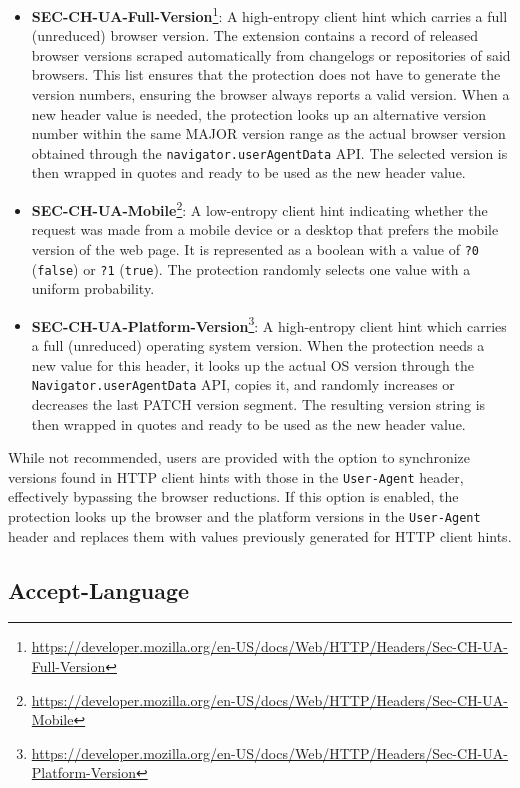 \begin{itemize}
	\item \textbf{SEC-CH-UA-Full-Version}\footnote{\url{https://developer.mozilla.org/en-US/docs/Web/HTTP/Headers/Sec-CH-UA-Full-Version}}: A high-entropy client hint which carries a full (unreduced) browser version. The extension contains a record of released browser versions scraped automatically from changelogs or repositories of said browsers. This list ensures that the protection does not have to generate the version numbers, ensuring the browser always reports a valid version. When a new header value is needed, the protection looks up an alternative version number within the same MAJOR version range as the actual browser version obtained through the \texttt{navigator.userAgentData} API. The selected version is then wrapped in quotes and ready to be used as the new header value.
	\item \textbf{SEC-CH-UA-Mobile}\footnote{\url{https://developer.mozilla.org/en-US/docs/Web/HTTP/Headers/Sec-CH-UA-Mobile}}: A low-entropy client hint indicating whether the request was made from a mobile device or a desktop that prefers the mobile version of the web page. It is represented as a boolean with a value of \texttt{?0} (\texttt{false}) or \texttt{?1} (\texttt{true}). The protection randomly selects one value with a uniform probability.
	\item \textbf{SEC-CH-UA-Platform-Version}\footnote{\url{https://developer.mozilla.org/en-US/docs/Web/HTTP/Headers/Sec-CH-UA-Platform-Version}}: A high-entropy client hint which carries a full (unreduced) operating system version. When the protection needs a new value for this header, it looks up the actual OS version through the \texttt{Navigator.userAgentData} API, copies it, and randomly increases or decreases the last PATCH version segment. The resulting version string is then wrapped in quotes and ready to be used as the new header value.
\end{itemize}

While not recommended, users are provided with the option to synchronize versions found in HTTP client hints with those in the \texttt{User-Agent} header, effectively bypassing the browser reductions. If this option is enabled, the protection looks up the browser and the platform versions in the \texttt{User-Agent} header and replaces them with values previously generated for HTTP client hints.



\subsection{Accept-Language}

